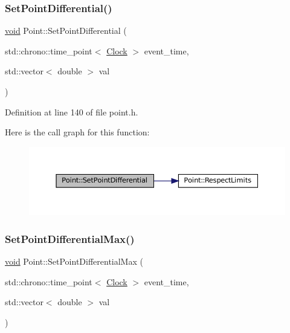 \subsubsection{\texorpdfstring{Set\+Point\+Differential()}{SetPointDifferential()}}
{\footnotesize\ttfamily \mbox{\hyperlink{glad_8h_a950fc91edb4504f62f1c577bf4727c29}{void}} Point\+::\+Set\+Point\+Differential (\begin{DoxyParamCaption}\item[{std\+::chrono\+::time\+\_\+point$<$ \mbox{\hyperlink{universe_8h_a0ef8d951d1ca5ab3cfaf7ab4c7a6fd80}{Clock}} $>$}]{event\+\_\+time,  }\item[{std\+::vector$<$ double $>$}]{val }\end{DoxyParamCaption})\hspace{0.3cm}{\ttfamily [inline]}}



Definition at line 140 of file point.\+h.

Here is the call graph for this function\+:\nopagebreak
\begin{figure}[H]
\begin{center}
\leavevmode
\includegraphics[width=350pt]{class_point_adb977a2f01e7a2b549e1bd36fa6f5354_cgraph}
\end{center}
\end{figure}
\mbox{\label{class_point_ac2e53da4cbee0dc39c0b7a4d3e3a6ee5}} 
\subsubsection{\texorpdfstring{Set\+Point\+Differential\+Max()}{SetPointDifferentialMax()}}
{\footnotesize\ttfamily \mbox{\hyperlink{glad_8h_a950fc91edb4504f62f1c577bf4727c29}{void}} Point\+::\+Set\+Point\+Differential\+Max (\begin{DoxyParamCaption}\item[{std\+::chrono\+::time\+\_\+point$<$ \mbox{\hyperlink{universe_8h_a0ef8d951d1ca5ab3cfaf7ab4c7a6fd80}{Clock}} $>$}]{event\+\_\+time,  }\item[{std\+::vector$<$ double $>$}]{val }\end{DoxyParamCaption})\hspace{0.3cm}{\ttfamily [inline]}}



